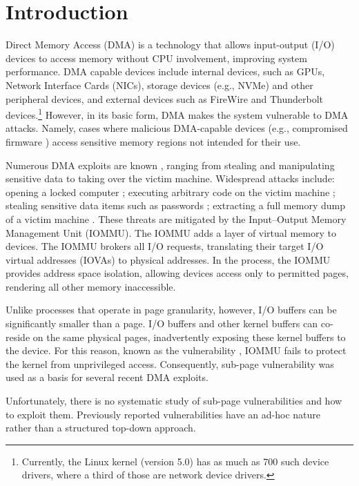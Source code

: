 \section{Introduction}

Direct Memory Access (DMA) is a technology that allows input-output (I/O) devices to access memory without CPU involvement, improving system performance.
DMA capable devices include internal devices, such as GPUs, Network Interface Cards (NICs), storage devices (e.g., NVMe) and other peripheral devices, and external devices such as FireWire and Thunderbolt devices.\footnote{Currently, the Linux kernel (version 5.0) has as much as 700 such device drivers, where a third of those are network device drivers.} However, in its basic form, DMA makes the system vulnerable to DMA attacks. Namely, cases where malicious DMA-capable devices (e.g., compromised firmware \cite{Gal14,Ben17a}) access sensitive memory regions not intended for their use. 


Numerous DMA exploits are known \cite{Dor04,BDK10,thunder}, ranging from stealing and manipulating sensitive data to taking over the victim machine. Widespread attacks include: opening a locked computer \cite{MM, Fin14}; executing arbitrary code on the victim machine \cite{Fri16, Woj08, AD10,thunder}; stealing sensitive data items such as passwords \cite{SB12, LKV13, Cim16, BR12}; extracting a full memory dump of a victim machine \cite{MM, Vol, Fin14, GA10}. These threats are mitigated by the Input–Output Memory Management Unit (IOMMU). The IOMMU adds a layer of virtual memory to devices. The IOMMU brokers all I/O requests, translating their target I/O virtual addresses (IOVAs) to physical addresses. In the process, the IOMMU provides address space isolation, allowing devices access only to permitted pages, rendering all other memory inaccessible.

Unlike processes that operate in page granularity, however, I/O buffers can be significantly smaller than a page. I/O buffers and other kernel buffers can co-reside on the same physical pages, inadvertently exposing these kernel buffers to the device. For this reason, known as the \subpage{} vulnerability \cite{MMT16,thunder}, IOMMU fails to protect the kernel from unprivileged access. Consequently, sub-page vulnerability was used as a basis for several recent DMA exploits.

Unfortunately, there is no systematic study of sub-page vulnerabilities and how to exploit them.
Previously reported vulnerabilities have an ad-hoc nature~\cite{thunder,MMT16,Ben17b} rather than a structured top-down approach. 

